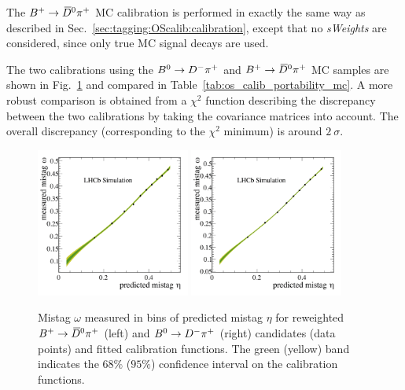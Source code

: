 The $B^+\rightarrow\kern 0.2em\overline{\kern -0.2em D}{}^0\pi^+$ MC calibration is performed in exactly the same way as described in Sec.~\ref{sec:tagging:OScalib:calibration}, except that no
\emph{sWeights} are considered, since only true MC signal decays are used.

The two calibrations using the $B^0\rightarrow D^-\pi^+$ and $B^+\rightarrow\kern 0.2em\overline{\kern -0.2em D}{}^0\pi^+$ MC samples are shown in Fig.~\ref{fig:os_calib_portability_mc} and compared in Table~\ref{tab:os_calib_portability_mc}. A more robust comparison is obtained from a $\chi^2$ function describing the discrepancy between the two calibrations by taking the covariance matrices into account. The overall discrepancy (corresponding to the $\chi^2$ minimum) is around $2~\sigma$.

\begin{figure}[t!]
        \begin{center}
                \includegraphics[width=0.45\textwidth]{04Flavourtagging/figs/OS_Combination_Calibration_Bu_MC.png}
                \includegraphics[width=0.45\textwidth]{04Flavourtagging/figs/OS_Combination_Calibration_Bd_MC.png}
        \end{center}
        \vspace{-5mm}
        \caption{Mistag $\omega$ measured in bins of predicted mistag $\eta$ for reweighted $B^+\rightarrow\kern 0.2em\overline{\kern -0.2em D}{}^0\pi^+$ (left) and $B^0\rightarrow D^-\pi^+$ (right) candidates (data points) and fitted calibration functions. The green (yellow) band indicates the $68\%$ ($95\%$) confidence interval on the calibration functions.}
        \label{fig:os_calib_portability_mc}
\end{figure}

